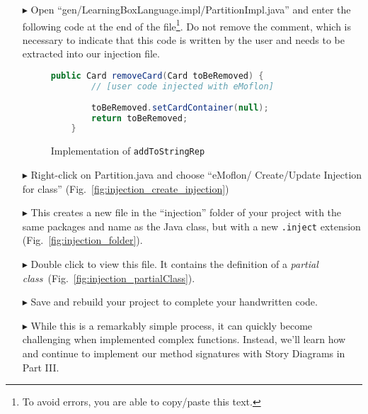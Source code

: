 \begin{itemize}


\item[$\blacktriangleright$] Open ``gen/LearningBoxLanguage.impl/PartitionImpl.java'' and enter the following code at the end of the file\footnote{To avoid
errors, you are able to copy/paste this text.}. Do not remove the comment, which is necessary to indicate that this code is written by the user and needs to be
extracted into our injection file.

\begin{figure}[htbp]
        \centering
        \begin{lstlisting}[language=Java, keywordstyle={\bfseries\color{purple}}, backgroundcolor=\color{white}]
    public Card removeCard(Card toBeRemoved) {
        // [user code injected with eMoflon]
        
        toBeRemoved.setCardContainer(null);
        return toBeRemoved;
    }
        \end{lstlisting}
        \caption{Implementation of \texttt{addToStringRep}}
        \label{fig:addToStringRep_impl}
\end{figure}

\item[$\blacktriangleright$] Right-click on Partition.java and choose ``eMoflon/ Create/Update Injection for class'' (Fig.~\ref{fig:injection_create_injection}) 
    
\item[$\blacktriangleright$] This creates a new file in the ``injection'' folder of your project with the same packages and name as the Java class, but with a
new \texttt{.inject} extension (Fig.~\ref{fig:injection_folder}). 

\item[$\blacktriangleright$] Double click to view this file. It contains the definition of a \textit{partial class}~(Fig.~\ref{fig:injection_partialClass}).

\item[$\blacktriangleright$] Save and rebuild your project to complete your handwritten code.

\item[$\blacktriangleright$] While this is a remarkably simple process, it can quickly become challenging when implemented complex functions. Instead, we'll
learn how and continue to implement our method signatures with Story Diagrams in Part III.

\end{itemize}

